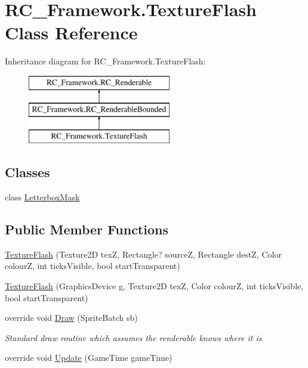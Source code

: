 \hypertarget{class_r_c___framework_1_1_texture_flash}{}\section{R\+C\+\_\+\+Framework.\+Texture\+Flash Class Reference}
\label{class_r_c___framework_1_1_texture_flash}
Inheritance diagram for R\+C\+\_\+\+Framework.\+Texture\+Flash\+:\begin{figure}[H]
\begin{center}
\leavevmode
\includegraphics[height=3.000000cm]{class_r_c___framework_1_1_texture_flash}
\end{center}
\end{figure}
\subsection*{Classes}
\begin{DoxyCompactItemize}
\item 
class \mbox{\hyperlink{class_r_c___framework_1_1_texture_flash_1_1_letterbox_mask}{Letterbox\+Mask}}
\end{DoxyCompactItemize}
\subsection*{Public Member Functions}
\begin{DoxyCompactItemize}
\item 
\mbox{\hyperlink{class_r_c___framework_1_1_texture_flash_a6a8cf95a19bdc9e0c6a2d6d4bed8cebc}{Texture\+Flash}} (Texture2D texZ, Rectangle? sourceZ, Rectangle destZ, Color colourZ, int ticks\+Visible, bool start\+Transparent)
\item 
\mbox{\hyperlink{class_r_c___framework_1_1_texture_flash_acb163f62b651134a0355012020ab1684}{Texture\+Flash}} (Graphics\+Device g, Texture2D texZ, Color colourZ, int ticks\+Visible, bool start\+Transparent)
\item 
override void \mbox{\hyperlink{class_r_c___framework_1_1_texture_flash_a37d7b37ad7c1816d6cf967ad784c7d0f}{Draw}} (Sprite\+Batch sb)
\begin{DoxyCompactList}\small\item\em Standard draw routine which assumes the renderable knows where it is \end{DoxyCompactList}\item 
override void \mbox{\hyperlink{class_r_c___framework_1_1_texture_flash_a84925900306ae16e7838be3a4620b2a7}{Update}} (Game\+Time game\+Time)
\end{DoxyCompactItemize}
